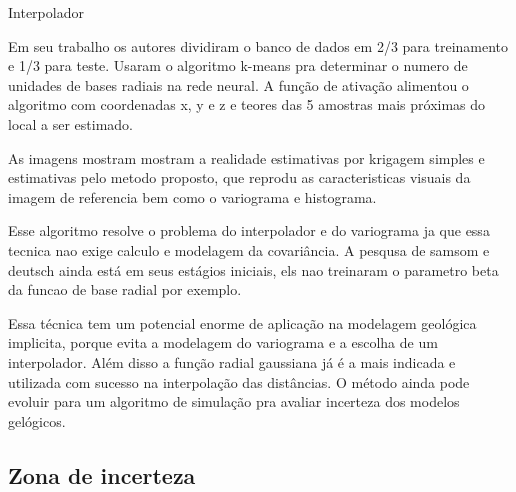 \documentclass[aspectratio=169]{beamer}
\begin{document}
\begin{frame}{Interpolador}
{		Em seu trabalho os autores dividiram o banco de dados em 2/3 para treinamento e 1/3 para teste. Usaram o algoritmo k-means pra determinar o numero de unidades de bases radiais na rede neural. A função de ativação alimentou o algoritmo com coordenadas x, y e z e teores das 5 amostras mais próximas do local a ser estimado.
		
		As imagens mostram mostram a realidade estimativas por krigagem simples e estimativas pelo metodo proposto, que reprodu as caracteristicas visuais da imagem de referencia bem como o variograma e histograma.
		
		Esse algoritmo resolve o problema do interpolador e do variograma ja que essa tecnica nao exige calculo e modelagem da covariância. A pesqusa de samsom e deutsch ainda está em seus estágios iniciais, els nao treinaram o parametro beta da funcao de base radial por exemplo. 
		
		Essa técnica tem um potencial enorme de aplicação na modelagem geológica implicita, porque evita a modelagem do variograma e a escolha de um interpolador. Além disso a função radial gaussiana já é a mais indicada e utilizada com sucesso na interpolação das distâncias. O método ainda pode evoluir para um algoritmo de simulação pra avaliar incerteza dos modelos gelógicos.}
\end{frame}

\subsection{Zona de incerteza}
\end{document}
